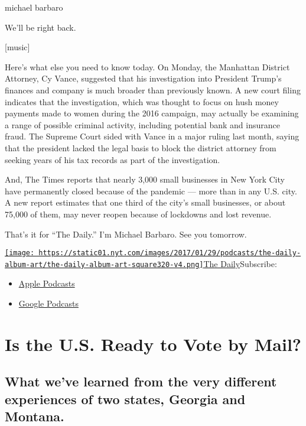 michael barbaro

We'll be right back.

{[}music{]}

Here's what else you need to know today. On Monday, the Manhattan
District Attorney, Cy Vance, suggested that his investigation into
President Trump's finances and company is much broader than previously
known. A new court filing indicates that the investigation, which was
thought to focus on hush money payments made to women during the 2016
campaign, may actually be examining a range of possible criminal
activity, including potential bank and insurance fraud. The Supreme
Court sided with Vance in a major ruling last month, saying that the
president lacked the legal basis to block the district attorney from
seeking years of his tax records as part of the investigation.

And, The Times reports that nearly 3,000 small businesses in New York
City have permanently closed because of the pandemic --- more than in
any U.S. city. A new report estimates that one third of the city's small
businesses, or about 75,000 of them, may never reopen because of
lockdowns and lost revenue.

That's it for ``The Daily.'' I'm Michael Barbaro. See you tomorrow.

\href{https://www.nytimes.com/column/the-daily}{\texttt{[image: https://static01.nyt.com/images/2017/01/29/podcasts/the-daily-album-art/the-daily-album-art-square320-v4.png]}The
Daily}Subscribe:

\begin{itemize}
\tightlist
\item
  \href{https://itunes.apple.com/us/podcast/id1200361736}{Apple
  Podcasts}
\item
  \href{https://www.google.com/podcasts?feed=aHR0cHM6Ly9yc3MuYXJ0MTkuY29tL3RoZS1kYWlseQ\%3D\%3D}{Google
  Podcasts}
\end{itemize}

\hypertarget{is-the-us-ready-to-vote-by-mail-1}{%
\section{Is the U.S. Ready to Vote by
Mail?}\label{is-the-us-ready-to-vote-by-mail-1}}

\hypertarget{what-weve-learned-from-the-very-different-experiences-of-two-states-georgia-and-montana-1}{%
\subsection{What we've learned from the very different experiences of
two states, Georgia and
Montana.}\label{what-weve-learned-from-the-very-different-experiences-of-two-states-georgia-and-montana-1}}

